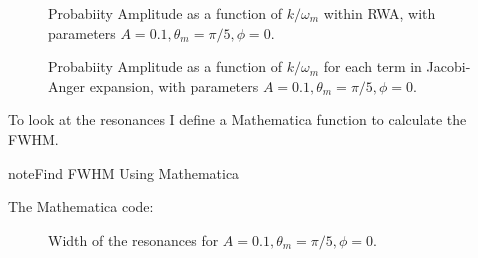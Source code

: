 \documentclass[letterpaper,12pt,english]{sphinxmanual}
\begin{document}
\begin{figure}[htbp]
\centering
\capstart

\noindent{}
\caption{Probabiity Amplitude as a function of \(k/\omega_m\) within RWA, with parameters \(A=0.1, \theta_m=\pi/5, \phi=0\).}\label{\detokenize{matter-stimulated/single-frequency:id5}}\end{figure}
\begin{figure}[htbp]
\centering
\capstart

\noindent{}
\caption{Probabiity Amplitude as a function of \(k/\omega_m\) for each term in Jacobi-Anger expansion, with parameters \(A=0.1, \theta_m=\pi/5, \phi=0\).}\label{\detokenize{matter-stimulated/single-frequency:id6}}\end{figure}

To look at the resonances I define a Mathematica function to calculate the FWHM.

\begin{sphinxadmonition}{note}{Find FWHM Using Mathematica}

The Mathematica code:

\begin{sphinxVerbatim}[commandchars=\\\{\}]
\PYG{p}{[}\PYG{p}{]}  \PYG{p}{[}  \PYG{p}{[}\PYG{p}{[}   \PYG{p}{]}       \PYG{p}{[}\PYG{p}{]}      \PYG{p}{[}\PYG{p}{]} \PYG{p}{]}\PYG{p}{]}
\end{sphinxVerbatim}
\end{sphinxadmonition}
\begin{figure}[htbp]
\centering
\capstart

\noindent{}
\caption{Width of the resonances for \(A=0.1, \theta_m=\pi/5, \phi=0\).}\label{\detokenize{matter-stimulated/single-frequency:id7}}\end{figure}
\end{document}
